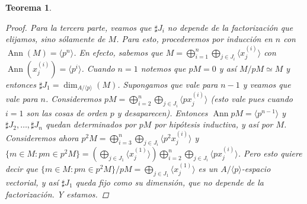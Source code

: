 \documentclass[12pt]{book}
\newtheorem{teo}{Teorema}[section]
\theoremstyle{definition}
\DeclareMathOperator{\ann}{Ann}
\begin{document}
\begin{teo}
\begin{proof}
Para la tercera parte, veamos que $\sharp J_i$ no depende de la factorización que elijamos, sino sólamente de $M$. Para esto, procederemos por inducción en $n$ con $\ann(M)=\langle p^n\rangle$. En efecto, sabemos que $M=\displaystyle\bigoplus_{i=1}^n\bigoplus_{j\in J_i}\langle x_j^{(i)}\rangle$ con $\ann (x_j^{(i)})=\langle p^i\rangle$. Cuando $n=1$ notemos que $pM=0$ y así $M/pM\simeq M$ y entonces $\sharp J_1 = \dim_{A/\langle p\rangle}(M)$. Supongamos que vale para $n-1$ y veamos que vale para $n$. Consideremos $pM = \displaystyle\bigoplus_{i=2}^n \displaystyle\bigoplus_{j\in J_i} \langle px_j^{(i)}\rangle$ (esto vale pues cuando $i=1$ son las cosas de orden $p$ y desaparecen). Entonces $\ann pM = \langle p^{n-1}\rangle$ y $\sharp J_2, \ldots , \sharp J_n$ quedan determinados por $pM$ por hipótesis inductiva, y así por $M$. Consideremos ahora $p^2M = \displaystyle\bigoplus_{i=3}^n \displaystyle\bigoplus_{j\in J_i} \langle p^2 x_j^{(i)}\rangle$ y $\{m\in M : pm \in p^2 M\} = \left(\displaystyle\bigoplus_{j\in J_1} \langle x_j^{(1)}\rangle\right)\displaystyle\bigoplus_{i=2}^n \bigoplus_{j\in J_i}\langle px_j^{(i)}\rangle$. Pero esto quiere decir que $\{m\in M : pm \in p^2 M\} / pM = \displaystyle\bigoplus_{j\in J_1}\langle x_j^{(1)}\rangle$ es un $A/\langle p\rangle$-espacio vectorial, y así $\sharp J_1$ queda fijo como su dimensión, que no depende de la factorización. Y estamos. 
\end{proof}
\end{teo}
\end{document}
